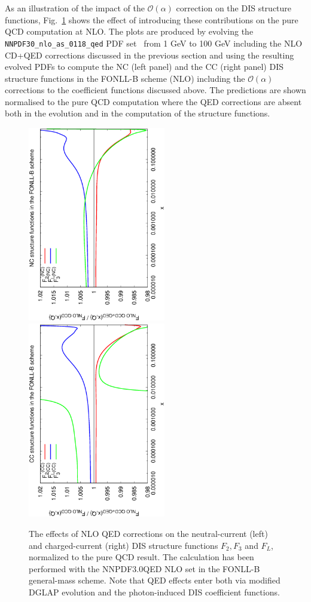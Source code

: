 As an illustration of the impact of the $\mathcal{O}(\alpha)$
correction on the DIS structure functions, Fig.~\ref{fig:StructFuncs}
shows the effect of introducing these contributions on the pure QCD
computation at NLO. The plots are produced by evolving the {\tt
  NNPDF30\_nlo\_as\_0118\_qed} PDF set~\cite{Bertone:2016ume} from 1
GeV to 100 GeV including the NLO CD+QED corrections discussed in the
previous section and using the resulting evolved PDFs to compute the
NC (left panel) and the CC (right panel) DIS structure functions in
the FONLL-B scheme (NLO) including the $\mathcal{O}(\alpha)$
corrections to the coefficient functions discussed above. The
predictions are shown normalised to the pure QCD computation where the
QED corrections are absent both in the evolution and in the
computation of the structure functions.

\begin{figure}[t]
\includegraphics[width=6cm,angle=270]{figs/NLOQEDCorrections_NC.eps}
\includegraphics[width=6cm,angle=270]{figs/NLOQEDCorrections_CC.eps}
\caption{The effects of NLO QED corrections on the neutral-current
(left) and charged-current (right) DIS structure functions
$F_2, F_3$ and $F_L$, normalized to the pure QCD result.
%
The calculation has been performed with the NNPDF3.0QED NLO
set in the FONLL-B general-mass scheme.
%
Note that QED effects enter both via modified DGLAP
evolution and the photon-induced DIS coefficient
functions.
}
\label{fig:StructFuncs}
\end{figure}

